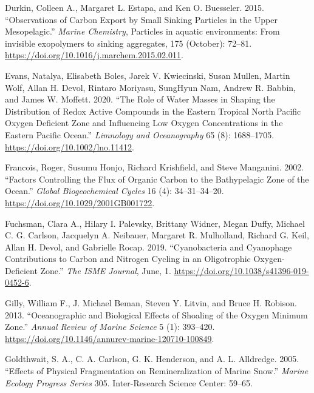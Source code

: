 \documentclass[]{article}
\begin{document}
\leavevmode\hypertarget{ref-durkinObservationsCarbonExport2015}{}%
Durkin, Colleen A., Margaret L. Estapa, and Ken O. Buesseler. 2015.
``Observations of Carbon Export by Small Sinking Particles in the Upper
Mesopelagic.'' \emph{Marine Chemistry}, Particles in aquatic
environments: From invisible exopolymers to sinking aggregates, 175
(October): 72--81. \url{https://doi.org/10.1016/j.marchem.2015.02.011}.

\leavevmode\hypertarget{ref-evansRoleWaterMasses2020}{}%
Evans, Natalya, Elisabeth Boles, Jarek V. Kwiecinski, Susan Mullen,
Martin Wolf, Allan H. Devol, Rintaro Moriyasu, SungHyun Nam, Andrew R.
Babbin, and James W. Moffett. 2020. ``The Role of Water Masses in
Shaping the Distribution of Redox Active Compounds in the Eastern
Tropical North Pacific Oxygen Deficient Zone and Influencing Low Oxygen
Concentrations in the Eastern Pacific Ocean.'' \emph{Limnology and
Oceanography} 65 (8): 1688--1705.
\url{https://doi.org/10.1002/lno.11412}.

\leavevmode\hypertarget{ref-francoisFactorsControllingFlux2002}{}%
Francois, Roger, Susumu Honjo, Richard Krishfield, and Steve Manganini.
2002. ``Factors Controlling the Flux of Organic Carbon to the
Bathypelagic Zone of the Ocean.'' \emph{Global Biogeochemical Cycles} 16
(4): 34--31--34--20. \url{https://doi.org/10.1029/2001GB001722}.

\leavevmode\hypertarget{ref-fuchsmanCyanobacteriaCyanophageContributions2019}{}%
Fuchsman, Clara A., Hilary I. Palevsky, Brittany Widner, Megan Duffy,
Michael C. G. Carlson, Jacquelyn A. Neibauer, Margaret R. Mulholland,
Richard G. Keil, Allan H. Devol, and Gabrielle Rocap. 2019.
``Cyanobacteria and Cyanophage Contributions to Carbon and Nitrogen
Cycling in an Oligotrophic Oxygen-Deficient Zone.'' \emph{The ISME
Journal}, June, 1. \url{https://doi.org/10.1038/s41396-019-0452-6}.

\leavevmode\hypertarget{ref-gillyOceanographicBiologicalEffects2013}{}%
Gilly, William F., J. Michael Beman, Steven Y. Litvin, and Bruce H.
Robison. 2013. ``Oceanographic and Biological Effects of Shoaling of the
Oxygen Minimum Zone.'' \emph{Annual Review of Marine Science} 5 (1):
393--420. \url{https://doi.org/10.1146/annurev-marine-120710-100849}.

\leavevmode\hypertarget{ref-goldthwaitEffectsPhysicalFragmentation2005}{}%
Goldthwait, S. A., C. A. Carlson, G. K. Henderson, and A. L. Alldredge.
2005. ``Effects of Physical Fragmentation on Remineralization of Marine
Snow.'' \emph{Marine Ecology Progress Series} 305. Inter-Research
Science Center: 59--65.
\end{document}
